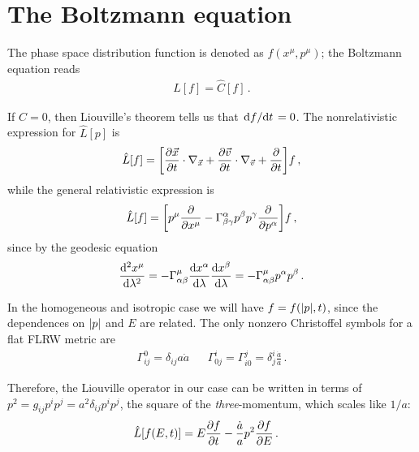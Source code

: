\documentclass[main.tex]{subfiles}
\begin{document}
\section{The Boltzmann equation}


The phase space distribution function is denoted as \(f(x^{\mu }, p^{\mu })\); the Boltzmann equation reads 
%
\begin{align}
\hat{L}[f] = \hat{C}[f] 
\,.
\end{align}

If \(\hat{C} = 0\), then Liouville's theorem tells us that \(\dv*{f}{t} = 0\). 
The nonrelativistic expression for \(\hat{L}[p]\) is 
%
\begin{align}
\hat{L}[f] = \qty[ \pdv{\vec{x}}{t} \cdot \nabla_{\vec{x}} + \pdv{\vec{v}}{t} \cdot \nabla_{\vec{v}} + \pdv{}{t}]f
\,,
\end{align}
%
while the general relativistic expression is 
%
\begin{align}
\hat{L}[f] = \qty[p^{\mu } \pdv{}{x^{\mu }} - \Gamma^{\alpha }_{\beta \gamma } p^{\beta } p^{\gamma } \pdv{}{p^{\alpha }}]f
\,,
\end{align}
%
since by the geodesic equation 
%
\begin{align}
\dv[2]{x^{\mu }}{\lambda} 
= - \Gamma^{\mu}_{\alpha \beta } \dv{x^{\alpha }}{\lambda } \dv{x^{\beta }}{\lambda }  
= - \Gamma^{\mu }_{\alpha \beta } p^{\alpha } p^{\beta }
\,.
\end{align}

In the homogeneous and isotropic case we will have \(f = f (\abs{p}, t)\), since the dependences on \(\abs{p}\) and \(E\) are related. 
The only nonzero Christoffel symbols for a flat FLRW metric are 
%
\begin{align}
\Gamma^{0}_{ij} = \delta_{ij} a \dot{a} && \Gamma^{i}_{0j} = \Gamma^{j}_{i0}
= \delta^{i}_{j} \frac{\dot{a}}{a}
\,.
\end{align}

Therefore, the Liouville operator in our case can be written in terms of \(p^2 = g_{ij} p^{i}p^{j} = a^2 \delta_{ij} p^{i} p^{j}\), the square of the \emph{three}-momentum, which scales like \(1/a\):
%
\begin{align}
\hat{L}[f(E, t)] &= E \pdv{f}{t} - \frac{\dot{a}}{a} p^2 \pdv{f}{E}   
\,.
\end{align}
\end{document}
